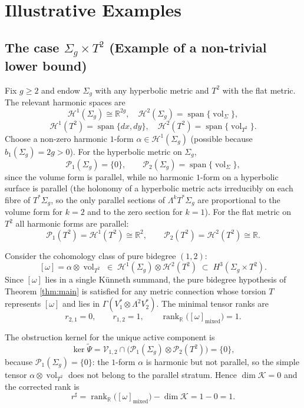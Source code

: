 \documentclass[11pt,reqno]{amsart}
\theoremstyle{plain}
\theoremstyle{definition}
\numberwithin{equation}{section}
\begin{document}
\section{Illustrative Examples}
\label{sec:examples}

\subsection*{The case $\Sigma_g \times T^2$ (Example of a non-trivial lower bound)}

Fix $g \geq 2$ and endow $\Sigma_g$ with any hyperbolic metric and
$T^2$ with the flat metric.  The relevant harmonic spaces are
\[
\mathcal{H}^{1}(\Sigma_g)\cong\mathbb{R}^{2g},\quad
\mathcal{H}^{2}(\Sigma_g)
  =\operatorname{span}\{\operatorname{vol}_{\Sigma}\},
\]
\[
\mathcal{H}^{1}(T^{2})
  =\operatorname{span}\{dx,dy\},\quad
\mathcal{H}^{2}(T^{2})
  =\operatorname{span}\{\operatorname{vol}_{T^{2}}\}.
\]
Choose a non-zero harmonic $1$-form
$\alpha\in\mathcal{H}^{1}(\Sigma_g)$
(possible because $b_{1}(\Sigma_g)=2g>0$).
For the hyperbolic metric on $\Sigma_g$,
\[
\mathcal{P}_{1}(\Sigma_g)=\{0\},\qquad
\mathcal{P}_{2}(\Sigma_g)
  =\operatorname{span}\{\operatorname{vol}_{\Sigma}\},
\]
since the volume form is parallel, while no harmonic $1$-form on a
hyperbolic surface is parallel (the holonomy of a hyperbolic metric
acts irreducibly on each fibre of $T^{*}\Sigma_g$, so the only
parallel sections of $\Lambda^{k}T^{*}\Sigma_g$ are proportional
to the volume form for $k=2$ and to the zero section for $k=1$).
For the flat metric on $T^{2}$ all harmonic forms are parallel:
\[
\mathcal{P}_{1}(T^{2})=\mathcal{H}^{1}(T^{2})\cong\mathbb{R}^{2},
\qquad
\mathcal{P}_{2}(T^{2})=\mathcal{H}^{2}(T^{2})\cong\mathbb{R}.
\]

Consider the cohomology class of pure bidegree $(1,2)$:
\[
[\omega]
=\alpha\otimes\operatorname{vol}_{T^{2}}
\;\in\;
\mathcal{H}^{1}(\Sigma_g)\otimes\mathcal{H}^{2}(T^{2})
\;\subset\;
H^{3}(\Sigma_g\times T^{2}).
\]
Since $[\omega]$ lies in a single K\"unneth summand, the pure bidegree
hypothesis of Theorem \ref{thm:main} is satisfied for any metric
connection whose torsion $T$ represents $[\omega]$ and lies in
$\Gamma(V_1^{*}\otimes\Lambda^{2}V_2^{*})$.
The minimal tensor ranks are
\[
r_{2,1}=0,\qquad r_{1,2}=1,\qquad
\operatorname{rank}_{\mathbb{R}}
  \bigl([\omega]_{\mathrm{mixed}}\bigr)=1.
\]

The obstruction kernel for the unique active component is
\[
\ker\widetilde{\Psi}
=\mathcal{V}_{1,2}\cap
  \bigl(\mathcal{P}_{1}(\Sigma_g)
        \otimes\mathcal{P}_{2}(T^{2})\bigr)
=\{0\},
\]
because $\mathcal{P}_{1}(\Sigma_g)=\{0\}$:
the $1$-form $\alpha$ is harmonic but not parallel, so
the simple tensor $\alpha\otimes\operatorname{vol}_{T^{2}}$
does not belong to the parallel stratum.
Hence $\dim\mathcal{K}=0$ and the corrected rank is
\[
r^{\sharp}
=\operatorname{rank}_{\mathbb{R}}
  \bigl([\omega]_{\mathrm{mixed}}\bigr)
  -\dim\mathcal{K}
=1-0=1.
\]
\end{document}

